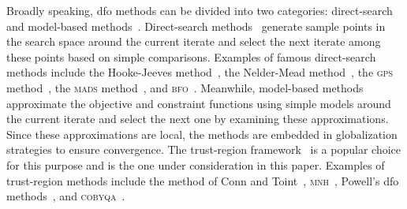 \documentclass{article}
\numberwithin{equation}{section}
\theoremstyle{definition}
\theoremstyle{plain}
\theoremstyle{remark}
\newcommand*{\solvername}[1]{\textsc{#1}\xspace}
\begin{document}
Broadly speaking, \gls{dfo} methods can be divided into two categories: direct-search and model-based methods~\cite{Conn_Scheinberg_Vicente_2009}.
Direct-search methods~\cite{Kolda_Lewis_Torczon_2003} generate sample points in the search space around the current iterate and select the next iterate among these points based on simple comparisons.
Examples of famous direct-search methods include the Hooke-Jeeves method~\cite{Hooke_Jeeves_1961}, the Nelder-Mead method~\cite{Nelder_Mead_1965}, the \solvername{gps} method~\cite{Booker_Etal_1999}, the \solvername{mads} method~\cite{Audet_Dennis_2006}, and \solvername{bfo}~\cite{Porcelli_Toint_2017,Porcelli_Toint_2022}.
Meanwhile, model-based methods~\cite[Part~4]{Audet_Hare_2017} approximate the objective and constraint functions using simple models around the current iterate and select the next one by examining these approximations.
Since these approximations are local, the methods are embedded in globalization strategies to ensure convergence.
The trust-region framework~\cite{Conn_Gould_Toint_2000} is a popular choice for this purpose and is the one under consideration in this paper.
Examples of trust-region methods include the method of Conn and Toint~\cite{Conn_Toint_1996}, \solvername{mnh}~\cite{Wild_2008}, Powell's \gls{dfo} methods~\cite{Powell_1994,Powell_2002,Powell_2006,Powell_2009}, and \solvername{cobyqa}~\cite{Ragonneau_2022,Ragonneau_Zhang_2023}.
\end{document}
